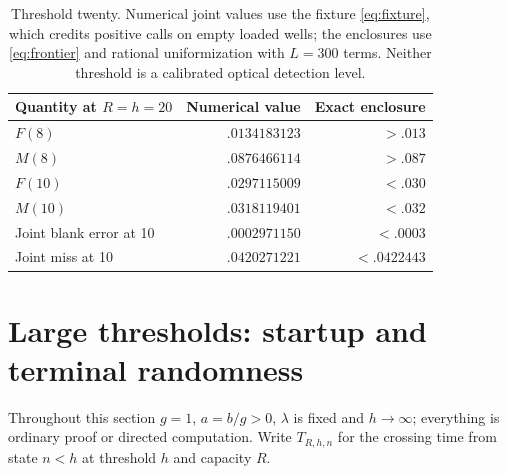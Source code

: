 \documentclass[11pt,a4paper]{article}
\theoremstyle{plain}
\theoremstyle{definition}
\theoremstyle{remark}
\begin{document}
\begin{table}[htbp]\centering\small
\begin{tabular}{lrr}\toprule Quantity at $R=h=20$ & Numerical value & Exact enclosure\\\midrule
$F(8)$ & $.0134183123$ & $>.013$\\
$M(8)$ & $.0876466114$ & $>.087$\\
$F(10)$ & $.0297115009$ & $<.030$\\
$M(10)$ & $.0318119401$ & $<.032$\\
Joint blank error at 10 & $.0002971150$ & $<.0003$\\
Joint miss at 10 & $.0420271221$ & $<.0422443$\\\bottomrule
\end{tabular}
\caption{Threshold twenty. Numerical joint values use the fixture \eqref{eq:fixture}, which credits positive calls on empty loaded wells; the enclosures use \eqref{eq:frontier} and rational uniformization with $L=300$ terms. Neither threshold is a calibrated optical detection level.}\label{tab:twenty}
\end{table}

\section{Large thresholds: startup and terminal randomness}\label{sec:large}
Throughout this section $g=1$, $a=b/g>0$, $\lambda$ is fixed and $h\to\infty$; everything is ordinary proof or directed computation. Write $T_{R,h,n}$ for the crossing time from state $n<h$ at threshold $h$ and capacity $R$.
\end{document}

